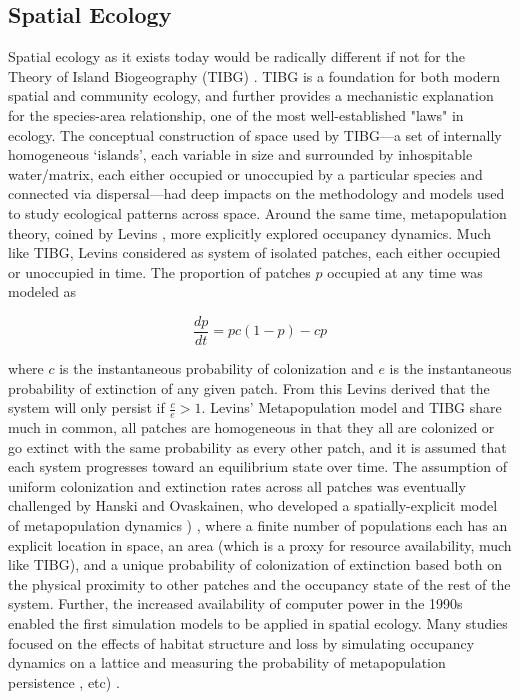 \documentclass[]{article}
\begin{document}
\hypertarget{spatial-ecology}{%
\subsection{Spatial Ecology}\label{spatial-ecology}}

Spatial ecology as it exists today would be radically different if not
for the Theory of Island Biogeography (TIBG)
\citep{macarthur_theory_2016}. TIBG is a foundation for both
modern spatial and community ecology, and further provides a mechanistic
explanation for the species-area relationship, one of the most
well-established "laws" in ecology. The conceptual construction of
space used by TIBG---a set of internally homogeneous `islands', each
variable in size and surrounded by inhospitable water/matrix, each
either occupied or unoccupied by a particular species and connected via
dispersal---had deep impacts on the methodology and models used to study
ecological patterns across space. Around the same time, metapopulation
theory, coined by Levins \citep{levins_demographic_1969}, more
explicitly explored occupancy dynamics. Much like TIBG, Levins
considered as system of isolated patches, each either occupied or
unoccupied in time. The proportion of patches \(p\) occupied at any time
was modeled as

\[\frac{dp}{dt} = pc(1-p) - cp\]

where \(c\) is the instantaneous probability of colonization and \(e\)
is the instantaneous probability of extinction of any given patch. From
this Levins derived that the system will only persist if
\(\frac{c}{e} > 1\). Levins' Metapopulation model and TIBG share much in
common, all patches are homogeneous in that they all are colonized or go
extinct with the same probability as every other patch, and it is
assumed that each system progresses toward an equilibrium state over
time. The assumption of uniform colonization and extinction rates across
all patches was eventually challenged by Hanski and Ovaskainen, who
developed a spatially-explicit model of metapopulation dynamics
\citep{hanski_practical_1994}) , where a finite number of populations each has
an explicit location in space, an area (which is a proxy for resource
availability, much like TIBG), and a unique probability of colonization
of extinction based both on the physical proximity to other patches and
the occupancy state of the rest of the system. Further, the increased
availability of computer power in the 1990s enabled the first simulation
models to be applied in spatial ecology. Many studies focused on the
effects of habitat structure and loss by simulating occupancy dynamics
on a lattice and measuring the probability of metapopulation persistence
\citep{bascompte}, etc) .
\end{document}
